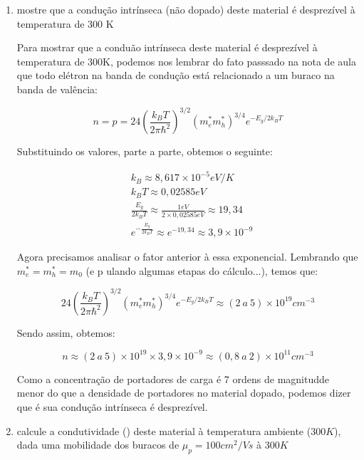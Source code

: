 \begin{enumerate}
  \begin{enumerate}
    \item mostre que a condução intrínseca (não dopado) deste material é desprezível à temperatura de 300 K

      Para mostrar que a conduão intrínseca deste material é desprezível à temperatura de 300K, podemos nos lembrar do fato passsado na nota de aula que todo elétron na banda de condução está relacionado a um buraco na banda de valência:

      \begin{equation}
          n = p = 24\left(\frac{k_BT}{2\pi\hbar^2}\right)^{3/2}(m_e^*m_h^*)^{3/4}e^{-E_g/2k_BT} 
      \end{equation}
      
      Substituindo os valores, parte a parte, obtemos o seguinte:

      \begin{center}
        \begin{align*}
          & k_B  \approx 8,617 \times 10^{-5}eV/K\\
          & k_BT  \approx 0,02585eV\\
          & \frac{E_g}{2k_BT}  \approx \frac{1 eV}{2 \times 0,02585 eV} \approx 19,34\\
          & e^{-\frac{E_g}{2k_BT}}  \approx e^{-19,34} \approx 3,9 \times 10^{-9}
        \end{align*}
      \end{center}
        Agora precisamos analisar o fator anterior à essa exponencial. Lembrando que $m^*_e = m^*_h = m_0$ (e p
        ulando algumas etapas do cálculo...), temos que:

        $$24\left(\frac{k_BT}{2\pi\hbar^2}\right)^{3/2}(m_e^*m_h^*)^{3/4}e^{-E_g/2k_BT} \approx (2 \ a \ 5) \times 10^{19}cm^{-3}$$

        Sendo assim, obtemos:

        $$n \approx (2 \ a \ 5)\times 10^{19} \times 3,9 \times 10^{-9} \approx (0,8 \ a \ 2) \times 10^{11}cm^{-3}$$
         
        Como a concentração de portadores de carga é 7 ordens de magnitudde menor do que a densidade de portadores no material dopado, podemos dizer que é sua condução intrínseca é desprezível.
        
      \item calcule a condutividade (\sigma) deste material à temperatura ambiente ($300 K$), dada uma mobilidade dos buracos de $\mu_p = 100 cm^2/Vs$ à $300 K$


\end{enumerate}
\end{enumerate}
